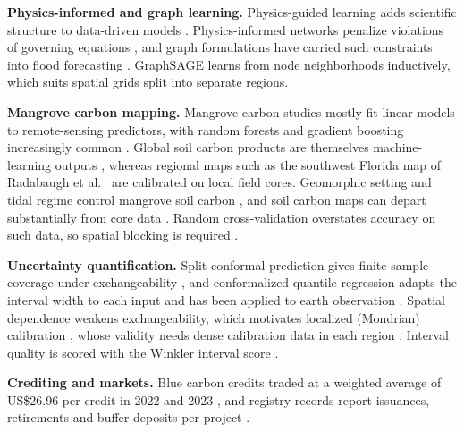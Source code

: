 \documentclass[conference]{IEEEtran}
\begin{document}
\textbf{Physics-informed and graph learning.} Physics-guided learning adds scientific structure to data-driven models \cite{willard2022piml}.
Physics-informed networks penalize violations of governing equations \cite{raissi2019pinn}, and graph formulations have carried such constraints into flood forecasting \cite{taghizadeh2025floodpignn}.
GraphSAGE \cite{hamilton2017graphsage} learns from node neighborhoods inductively, which suits spatial grids split into separate regions.

\textbf{Mangrove carbon mapping.} Mangrove carbon studies mostly fit linear models to remote-sensing predictors, with random forests and gradient boosting increasingly common \cite{roy2024mangroveasiapacific}.
Global soil carbon products are themselves machine-learning outputs \cite{sanderman2018map}, whereas regional maps such as the southwest Florida map of Radabaugh et al.\ \cite{radabaugh2023bluecarbon} are calibrated on local field cores.
Geomorphic setting and tidal regime control mangrove soil carbon \cite{rovai2018controls,krauss2014sealevel}, and soil carbon maps can depart substantially from core data \cite{holmquist2018tidal}.
Random cross-validation overstates accuracy on such data, so spatial blocking is required \cite{roberts2017cv,ploton2020spatial}.

\textbf{Uncertainty quantification.} Split conformal prediction gives finite-sample coverage under exchangeability \cite{lei2018conformal}, and conformalized quantile regression adapts the interval width to each input \cite{romano2019cqr} and has been applied to earth observation \cite{eo_conformal2024}.
Spatial dependence weakens exchangeability, which motivates localized (Mondrian) calibration \cite{vovk2005alrw,lou2024geoconformal}, whose validity needs dense calibration data in each region \cite{mao2024validmodelfree}.
Interval quality is scored with the Winkler interval score \cite{winkler1972interval,gneiting2007scoring}.

\textbf{Crediting and markets.} Blue carbon credits traded at a weighted average of US\$26.96 per credit in 2022 and 2023 \cite{farahmand2025bluecredits}, and registry records report issuances, retirements and buffer deposits per project \cite{vrod2026}.
\end{document}
